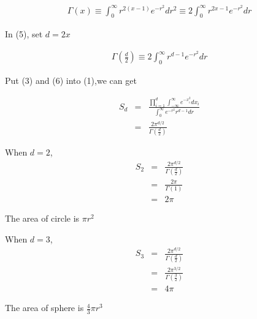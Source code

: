 \documentclass{article} %
\begin{document}
\begin{equation}
    \begin{array}{rcl}
      	\Gamma(x) \equiv \int_{0}^{\infty}r^{2(x-1)}e^{-r^2} dr^2 \equiv 2\int_{0}^{\infty}r^{2x-1}e^{-r^2} dr
    \end{array}
\end{equation}

In (5), set $d= 2x$

\begin{equation}
    \begin{array}{rcl}
      	\Gamma(\frac{d}{2})  \equiv 2\int_{0}^{\infty}r^{d-1}e^{-r^2} dr
    \end{array}
\end{equation}

Put (3) and (6) into (1),we can get

\begin{equation}
    \begin{array}{rcl}
     	S_d  & = & \frac{\prod\limits_{i = 1}^{d}\int_{-\infty}^{\infty}e^{-x_i^2} d x_i}{\int_{0}^{\infty}e^{-r^2}r^{d-1}dr} \\
	& = & \frac{2\pi^{d/2}}{\Gamma(\frac{d}{2})}
    \end{array}
\end{equation}

When $d = 2$,
\begin{equation}
    \begin{array}{rcl}
     	S_2  & = & \frac{2\pi^{d/2}}{\Gamma(\frac{d}{2})} \\
	& = & \frac{2\pi}{\Gamma(1)} \\
	& = & 2\pi
    \end{array}
\end{equation}

The area of circle is $\pi r ^ 2$

When $d = 3$,
\begin{equation}
    \begin{array}{rcl}
     	S_3  & = & \frac{2\pi^{d/2}}{\Gamma(\frac{d}{2})} \\
	& = & \frac{2\pi^{3/2}}{\Gamma(\frac{3}{2})} \\
	& = & 4\pi
    \end{array}
\end{equation}

The area of sphere is $\frac{4}{3} \pi r ^ 3$

\end{document}
